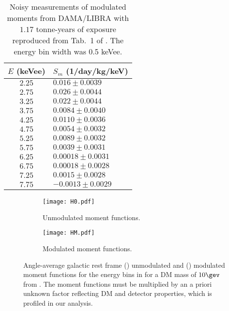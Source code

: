 \documentclass{article}
\begin{document}
\begin{table}
\centering
\begin{tabular}{cl}
\toprule
$E$ (keVee) & $S_m$ (1/day/kg/keV)\\
\midrule
$2.25$ & $0.016 \pm 0.0039$\\
$2.75$ & $0.026 \pm 0.0044$\\
$3.25$ & $0.022 \pm 0.0044$\\
$3.75$ & $0.0084 \pm 0.0040$\\
$4.25$ & $0.0110 \pm 0.0036$\\
$4.75$ & $0.0054 \pm 0.0032$\\
$5.25$ & $0.0089 \pm 0.0032$\\
$5.75$ & $0.0039 \pm 0.0031$\\
$6.25$ & $0.00018 \pm 0.0031$\\
$6.75$ & $0.00018 \pm 0.0028$\\
$7.25$ & $0.0015 \pm 0.0028$\\
$7.75$ & $-0.0013 \pm 0.0029$\\
\bottomrule
\end{tabular}
\caption{Noisy measurements of modulated moments from DAMA/LIBRA\cite{Bernabei:2010mq} with $1.17$ tonne-years of exposure reproduced from Tab.~1 of . The energy bin width was 0.5 keVee.}
\label{tab:sm}
\end{table}

\begin{figure}[t]
    \centering
    \begin{subfigure}[b]{0.475\textwidth}
        \centering
        \texttt{[image: H0.pdf]}
        \caption{Unmodulated moment functions.}
        \label{fig:H0}
    \end{subfigure}
    \begin{subfigure}[b]{0.475\textwidth}
        \centering
        \texttt{[image: HM.pdf]}
        \caption{Modulated moment functions.}
        \label{fig:HM}
    \end{subfigure}
    
    \caption{Angle-average galactic rest frame () unmodulated and () modulated moment functions for the energy bins in  for a DM mass of $10\gev$ from . The moment functions must be multiplied by an a priori unknown factor reflecting DM and detector properties, which is profiled in our analysis.}
    \label{fig:moments}
\end{figure}
\end{document}
